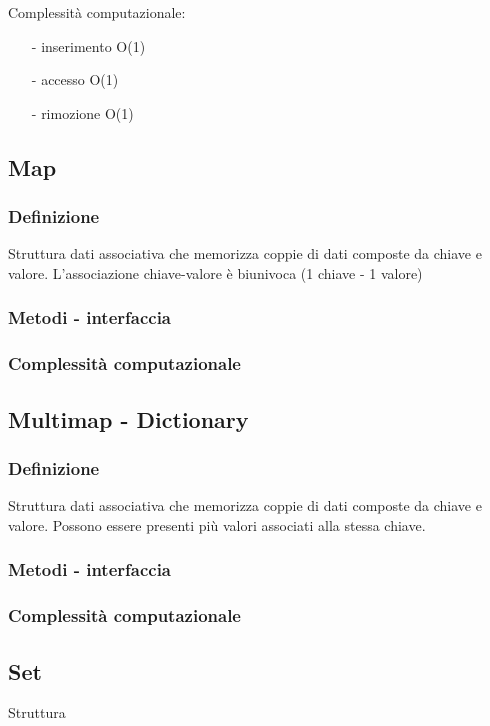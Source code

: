 \documentclass[a4paper]{article}
\begin{document}
Complessità computazionale:
\begin{itemize} [topsep=3pt, itemsep=0pt]
	\item[-] inserimento O(1)
	\item[-] accesso O(1)
	\item[-] rimozione O(1)
\end{itemize}


\subsection{Map}
\subsubsection*{Definizione}
Struttura dati associativa che memorizza coppie di dati composte da chiave e valore.
L'associazione chiave-valore è biunivoca (1 chiave - 1 valore)

\subsubsection*{Metodi - interfaccia}

\subsubsection*{Complessità computazionale}

\subsection{Multimap - Dictionary}
\subsubsection*{Definizione}
Struttura dati associativa che memorizza coppie di dati composte da chiave e valore.
Possono essere presenti più valori associati alla stessa chiave.

\subsubsection*{Metodi - interfaccia}
\subsubsection*{Complessità computazionale}

\subsection{Set}
Struttura 
\end{document}
